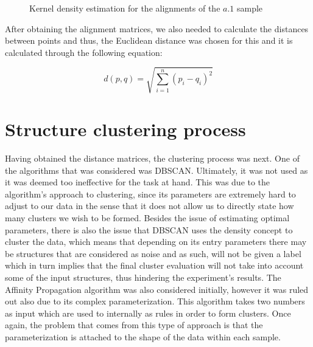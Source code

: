 \begin{figure}[htbp]
	\centering
	\newline
	\caption{Kernel density estimation for the alignments of the $a.1$ sample}
	\label{fig:kdea1}
\end{figure}

After obtaining the alignment matrices, we also needed to calculate the distances between points and thus, the Euclidean distance was chosen for this and it is calculated through the following equation:

	$$d(p,q) = \sqrt{\sum_{i = 1}^{n}\left( p_i - q_i \right)^2}$$


\chapter{Structure clustering process}
Having obtained the distance matrices, the clustering process was next. One of the algorithms that was considered was DBSCAN. Ultimately, it was not used as it was deemed too ineffective for the task at hand. This was due to the algorithm's approach to clustering, since its parameters are extremely hard to adjust to our data in the sense that it does not allow us to directly state how many clusters we wish to be formed. Besides the issue of estimating optimal parameters, there is also the issue that DBSCAN uses the density concept to cluster the data, which means that depending on its entry parameters there may be structures that are considered as noise and as such, will not be given a label which in turn implies that the final cluster evaluation will not take into account some of the input structures, thus hindering the experiment's results. The Affinity Propagation algorithm was also considered initially, however it was ruled out also due to its complex parameterization. This algorithm takes two numbers as input which are used to internally as rules in order to form clusters. Once again, the problem that comes from this type of approach is that the parameterization is attached to the shape of the data within each sample.

